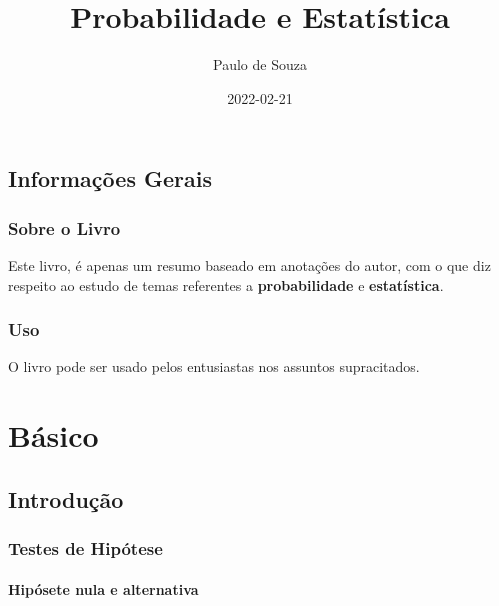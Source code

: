 \documentclass[
]{book}
\title{Probabilidade e Estatística}
\author{Paulo de Souza}
\date{2022-02-21}
\begin{document}
\maketitle

{
\setcounter{tocdepth}{1}
\tableofcontents
}
\hypertarget{informauxe7uxf5es-gerais}{%
\chapter*{Informações Gerais}\label{informauxe7uxf5es-gerais}}

\hypertarget{sobre-o-livro}{%
\section*{Sobre o Livro}\label{sobre-o-livro}}

Este livro, é apenas um resumo baseado em anotações do autor, com o que diz respeito ao estudo de temas referentes a \textbf{probabilidade} e \textbf{estatística}.

\hypertarget{uso}{%
\section*{Uso}\label{uso}}

O livro pode ser usado pelos entusiastas nos assuntos supracitados.

\hypertarget{part-buxe1sico}{%
\part{Básico}\label{part-buxe1sico}}

\hypertarget{introduuxe7uxe3o}{%
\chapter{Introdução}\label{introduuxe7uxe3o}}

\hypertarget{testes-de-hipuxf3tese}{%
\section{Testes de Hipótese}\label{testes-de-hipuxf3tese}}

\hypertarget{hipuxf3sete-nula-e-alternativa}{%
\subsection{Hipósete nula e alternativa}\label{hipuxf3sete-nula-e-alternativa}}
\end{document}
